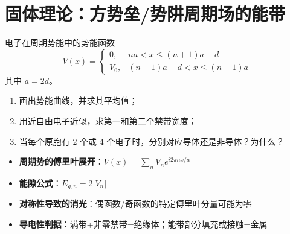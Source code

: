 \section{固体理论：方势垒/势阱周期场的能带}
\label{sec:square-barrier-band}

\begin{modelbox}[题目：方势垒周期势的近自由电子能带]
电子在周期势能中的势能函数
\[
V(x)=\begin{cases}
0, & na<x\le(n+1)a-d\\
V_0, & (n+1)a-d<x\le(n+1)a
\end{cases}
\]
其中 $a=2d$。
\begin{enumerate}
    \item 画出势能曲线，并求其平均值；
    \item 用近自由电子近似，求第一和第二个禁带宽度；
    \item 当每个原胞有 2 个或 4 个电子时，分别对应导体还是非导体？为什么？
\end{enumerate}
\end{modelbox}

\begin{tipbox}[考点快速分析]
\begin{itemize}
    \item \textbf{周期势的傅里叶展开}：$V(x)=\sum_n V_n e^{i2\pi nx/a}$
    \item \textbf{能隙公式}：$E_{g,n}=2|V_n|$
    \item \textbf{对称性导致的消光}：偶函数/奇函数的特定傅里叶分量可能为零
    \item \textbf{导电性判据}：满带+非零禁带=绝缘体；能带部分填充或接触=金属
\end{itemize}
\end{tipbox}

